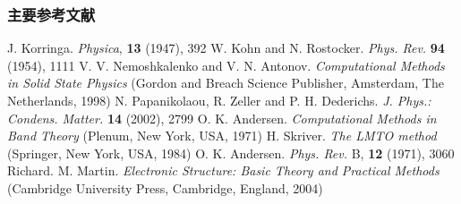\documentclass[cjk,slidestop,compress,mathserif,blue]{beamer}
\begin{document}
\appendix
\begin{thebibliography}{99}
\frame
{
\frametitle{主要参考文献}
{\small
	\textrm{J. Korringa. \textit{Physica}, \textbf{13} (1947), 392}
	\textrm{W. Kohn and N. Rostocker. \textit{Phys. Rev.} \textbf{94} (1954), 1111}
	\textrm{V. V. Nemoshkalenko and V. N. Antonov. \textit{Computational Methods in Solid State Physics} (Gordon and Breach Science Publisher, Amsterdam, The Netherlands, 1998)}
	\textrm{N. Papanikolaou, R. Zeller and P. H. Dederichs. \textit{J. Phys.: Condens. Matter.} \textbf{14} (2002), 2799}
	\textrm{O. K. Andersen. \textit{Computational Methods in Band Theory} (Plenum, New York, USA, 1971)}
	\textrm{H. Skriver. \textit{The LMTO method} (Springer, New York, USA, 1984)}
	\textrm{O. K. Andersen. \textit{Phys. Rev.} B, \textbf{12} (1971), 3060}
	\textrm{Richard. M. Martin. \textit{Electronic Structure: Basic Theory and Practical Methods} (Cambridge University Press, Cambridge, England, 2004)}
}
\nocite*{}
}
\end{thebibliography}
\end{document}
